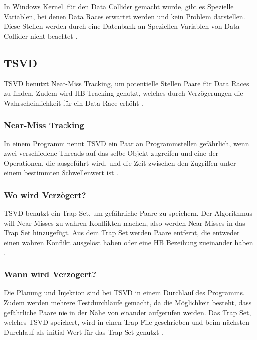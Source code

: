 In Windows Kernel, für den Data Collider gemacht wurde, gibt es Spezielle Variablen, bei denen Data Races erwartet werden und kein Problem darstellen. Diese Stellen werden durch eine Datenbank an Speziellen Variablen von Data Collider nicht beachtet \cite[vgl.][8]{erickson_effective_nodate}.

\subsection*{TSVD}

\ac{TSVD} benutzt Near-Miss Tracking, um potentielle Stellen Paare für Data Races zu finden. Zudem wird \acs{HB} Tracking genutzt, welches durch Verzögerungen die Wahrscheinlichkeit für ein Data Race erhöht \cite[vgl.][163]{li_efficient_2019}.

\subsubsection*{Near-Miss Tracking}

In einem Programm nennt \acs{TSVD} ein Paar an Programmstellen gefährlich, wenn zwei verschiedene Threads auf das selbe Objekt zugreifen und eine der Operationen, die ausgeführt wird, und die Zeit zwischen den Zugriffen unter einem bestimmten Schwellenwert ist \cite[vgl.][168]{li_efficient_2019}.  

\subsubsection*{Wo wird Verzögert?}

\acs{TSVD} benutzt ein Trap Set, um gefährliche Paare zu speichern. Der Algorithmus will Near-Misses zu wahren Konflikten machen, also werden Near-Misses in das Trap Set hinzugefügt. Aus dem Trap Set werden Paare entfernt, die entweder einen wahren Konflikt ausgelöst haben oder eine \acs{HB} Bezeihung zueinander haben \cite[vgl.][167]{li_efficient_2019}.

\subsubsection*{Wann wird Verzögert?}

Die Planung und Injektion sind bei \acs{TSVD} in einem Durchlauf des Programms. Zudem werden mehrere Testdurchläufe gemacht, da die Möglichkeit besteht, dass gefährliche Paare nie in der Nähe von einander aufgerufen werden. Das Trap Set, welches \acs{TSVD} speichert, wird in einen Trap File geschrieben und beim nächsten Durchlauf als initial Wert für das Trap Set genutzt \cite[vgl.][169]{li_efficient_2019}.  



